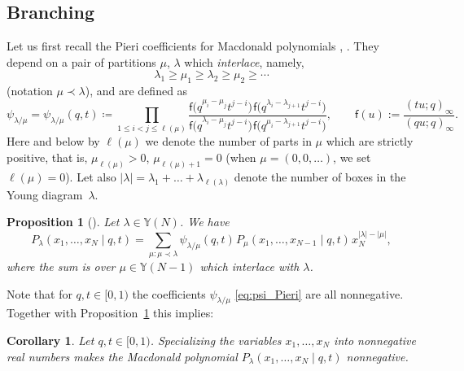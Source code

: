 \documentclass[11pt]{article}
\numberwithin{equation}{section}
\numberwithin{equation}{section}
\newtheorem{Corollary}[Theorem]{Corollary}
\newtheorem{Proposition}[Theorem]{Proposition}
{ \theoremstyle{definition}
\newtheorem{Definition}[Theorem]{Definition}}
\begin{document}
\subsection{Branching}\label{sub:branching}

Let us first recall the Pieri coefficients for Macdonald polynomials
\cite[formula~(VI.6.24.ii)]{Macdonald1995},
\cite[formula~(2.11)]{BorodinCorwin2011Macdonald}.
They depend on a pair of partitions $\mu$, $\lambda$
which \emph{interlace}, namely,
\begin{equation*}%
	\lambda_1\ge \mu_1\ge \lambda_2\ge \mu_2\ge \cdots
\end{equation*}
(notation $\mu\prec \lambda$), and are defined as
\begin{equation}
	\label{eq:psi_Pieri}
	\psi_{\lambda/\mu}
	=
	\psi_{\lambda/\mu}(q,t)
	\coloneqq
	\prod_{1\le i<j\le \ell(\mu)}
	\frac{\mathsf{f}\big(q^{\mu_i-\mu_j}t^{j-i}\big)
	\hspace{1pt}\mathsf{f}\big(q^{\lambda_i-\lambda_{j+1}}t^{j-i}\big)}
	{\mathsf{f}\big(q^{\lambda_i-\mu_j}t^{j-i}\big)
	\hspace{1pt}\mathsf{f}\big(q^{\mu_i-\lambda_{j+1}}t^{j-i}\big)},
	\qquad
	\mathsf{f}(u):=\frac{(tu;q)_{\infty}}{(qu;q)_{\infty}}.
\end{equation}
Here and below by $\ell(\mu)$ we denote the number of
parts in $\mu$ which are strictly positive,
that is, $\mu_{\ell(\mu)}>0$, $\mu_{\ell(\mu)+1}=0$ (when $\mu=(0,0,\dots )$, we set $\ell(\mu)=0$).
Let also $|\lambda|=\lambda_1+\dots+\lambda_{\ell(\lambda)}$
denote the number of boxes in the Young diagram~$\lambda$.

\begin{Proposition}[{\cite[formula~(VI.7.13$'$)]{Macdonald1995}}]
	\label{prop:branching}
	Let $\lambda\in \mathbb{Y}(N)$.
	We have
	\begin{equation}
		\label{eq:branching}
		P_\lambda(x_1,\dots,x_N \mid q,t)
		=
		\sum_{\mu\colon\mu\prec\lambda}
		\psi_{\lambda/\mu}(q,t)\hspace{1pt} P_\mu(x_1,\dots,x_{N-1} \mid q,t )\hspace{1pt}
		x_N^{|\lambda|-|\mu|},
	\end{equation}
	where the sum is over
	$\mu\in \mathbb{Y}(N-1)$ which interlace with $\lambda$.
\end{Proposition}

Note that for $q,t\in [0,1)$ the coefficients $\psi_{\lambda/\mu}$
\eqref{eq:psi_Pieri} are all nonnegative.
Together with Proposition~\ref{prop:branching} this implies:
\begin{Corollary}
	\label{cor:nonnegative_spec}
	Let $q,t\in[0,1)$. Specializing the variables
	$x_1,\dots,x_N $ into
	nonnegative real numbers
	makes the Macdonald polynomial
	$P_\lambda(x_1,\dots,x_N\mid q,t)$ nonnegative.
\end{Corollary}
\end{document}
